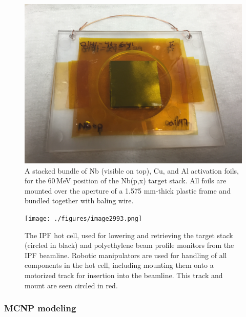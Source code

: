\begin{figure}
 \centering
 \includegraphics[width=0.75\columnwidth]{./figures/IMG_1969.JPG}
 \caption{A stacked bundle of Nb (visible on top), Cu, and Al activation foils, for the 60\,MeV position of the Nb(p,x) target stack. All foils are mounted over the aperture of a 1.575 mm-thick plastic frame and bundled together with baling wire.}
 \label{fig:fe_IMG_1969}
\end{figure}



\begin{figure}
 \centering
 \texttt{[image: ./figures/image2993.png]}
 \caption{The IPF hot cell, used for lowering and retrieving the target stack (circled in black) and polyethylene beam profile monitors from the IPF beamline. Robotic manipulators are used for handling of all components in the hot cell, including mounting them onto a motorized track for insertion into the beamline. This track and mount are seen circled in red.}
 \label{fig:fe_IMG_1984}
\end{figure}



\subsubsection{MCNP modeling}





